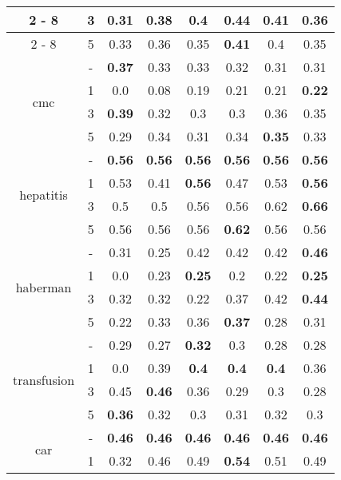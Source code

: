 \begin{table}[H]
\begin{center}
{\begin{tabular}{c|c|cccccc}
					\cline{2%
						-%
						8}%
					&3&0.31&0.38&0.4&\textbf{0.44}&0.41&0.36\\%
					\cline{2%
						-%
						8}%
					&5&0.33&0.36&0.35&\textbf{0.41}&0.4&0.35\\%
					\hline%
					\multirow{4}{*}{cmc}&{-}&\textbf{0.37}&0.33&0.33&0.32&0.31&0.31\\%
					\cline{2%
						-%
						8}%
					&1&0.0&0.08&0.19&0.21&0.21&\textbf{0.22}\\%
					\cline{2%
						-%
						8}%
					&3&\textbf{0.39}&0.32&0.3&0.3&0.36&0.35\\%
					\cline{2%
						-%
						8}%
					&5&0.29&0.34&0.31&0.34&\textbf{0.35}&0.33\\%
					\hline%
					\multirow{4}{*}{hepatitis}&{-}&\textbf{0.56}&\textbf{0.56}&\textbf{0.56}&\textbf{0.56}&\textbf{0.56}&\textbf{0.56}\\%
					\cline{2%
						-%
						8}%
					&1&0.53&0.41&\textbf{0.56}&0.47&0.53&\textbf{0.56}\\%
					\cline{2%
						-%
						8}%
					&3&0.5&0.5&0.56&0.56&0.62&\textbf{0.66}\\%
					\cline{2%
						-%
						8}%
					&5&0.56&0.56&0.56&\textbf{0.62}&0.56&0.56\\%
					\hline%
					\multirow{4}{*}{haberman}&{-}&0.31&0.25&0.42&0.42&0.42&\textbf{0.46}\\%
					\cline{2%
						-%
						8}%
					&1&0.0&0.23&\textbf{0.25}&0.2&0.22&\textbf{0.25}\\%
					\cline{2%
						-%
						8}%
					&3&0.32&0.32&0.22&0.37&0.42&\textbf{0.44}\\%
					\cline{2%
						-%
						8}%
					&5&0.22&0.33&0.36&\textbf{0.37}&0.28&0.31\\%
					\hline%
					\multirow{4}{*}{transfusion}&{-}&0.29&0.27&\textbf{0.32}&0.3&0.28&0.28\\%
					\cline{2%
						-%
						8}%
					&1&0.0&0.39&\textbf{0.4}&\textbf{0.4}&\textbf{0.4}&0.36\\%
					\cline{2%
						-%
						8}%
					&3&0.45&\textbf{0.46}&0.36&0.29&0.3&0.28\\%
					\cline{2%
						-%
						8}%
					&5&\textbf{0.36}&0.32&0.3&0.31&0.32&0.3\\%
					\hline%
					\multirow{4}{*}{car}&{-}&\textbf{0.46}&\textbf{0.46}&\textbf{0.46}&\textbf{0.46}&\textbf{0.46}&\textbf{0.46}\\%
					\cline{2%
						-%
						8}%
					&1&0.32&0.46&0.49&\textbf{0.54}&0.51&0.49\\%

\end{tabular}}
\end{center}
\end{table}
